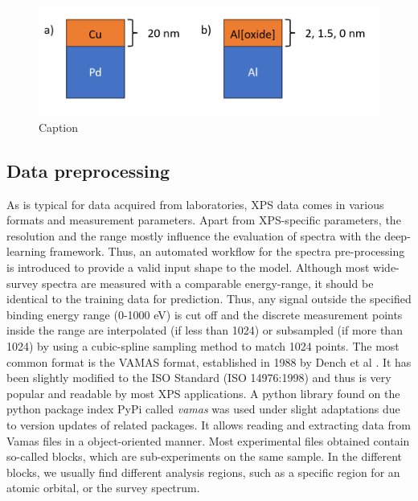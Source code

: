 \begin{figure}
    \centering
    \includegraphics{Figures/experimental_samples.png}
    \caption{Caption}
    \label{fig:enter-label}
\end{figure}


\subsection{Data preprocessing}

As is typical for data acquired from laboratories, XPS data comes in various formats and measurement parameters. Apart from XPS-specific parameters, the resolution and the range mostly influence the evaluation of spectra with the deep-learning framework. Thus, an automated workflow for the spectra pre-processing is introduced to provide a valid input shape to the model.
Although most wide-survey spectra are measured with a comparable energy-range, it should be identical to the training data for prediction. Thus, any signal outside the specified binding energy range (0-1000 eV) is cut off and the discrete measurement points inside the range are interpolated (if less than 1024) or subsampled (if more than 1024) by using a cubic-spline sampling method to match 1024 points. The most common format is the VAMAS format, established in 1988 by Dench et al \cite{dench_vamas_1988}. It has been slightly modified to the ISO Standard \cite{1400-1700_iso_nodate}(ISO 14976:1998) and thus is very popular and readable by most XPS applications. A python library found on the python package index PyPi called \emph{vamas} \cite{krinninger_vamas_nodate} was used under slight adaptations due to version updates of related packages. It allows reading and extracting data from Vamas files in a object-oriented manner.
Most experimental files obtained contain so-called blocks, which are sub-experiments on the same sample. In the different blocks, we usually find different analysis regions, such as a specific region for an atomic orbital, or the survey spectrum.

